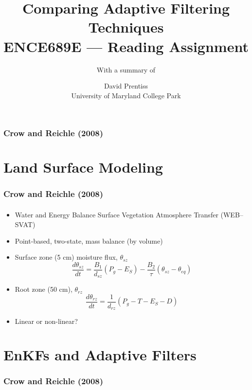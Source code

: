 \documentclass[mathserif]{beamer}
\begin{document}
\nobibliography*
\title{Comparing Adaptive Filtering Techniques \\ ENCE689E --- Reading Assignment}
\author{David Prentiss \\ University of Maryland College Park}
\subtitle{With a summary of \\ }

\frame{\titlepage}

\begin{frame}
  \frametitle{Crow and Reichle (2008)}
  \tableofcontents
\end{frame}

\section{Land Surface Modeling}

\begin{frame}
  \frametitle{Crow and Reichle (2008)}
  \tableofcontents[currentsection]
\end{frame}

\begin{frame}
  \frametitle{\insertsection}
  \begin{itemize}
    \item Water and Energy Balance Surface Vegetation Atmosphere Transfer (WEB--SVAT)
    \item Point-based, two-state, mass balance (by volume)
    \item Surface zone (5 cm) moisture flux, $\theta_{sz}$
      \begin{equation}
        \frac{d\theta_{sz}}{dt}=\frac{B_1}{d_{sz}}\left(P_g - E_S\right)-\frac{B_2}{\tau}\left(\theta_{sz}-\theta_{eq}\right)
      \end{equation}
    \item Root zone (50 cm), $\theta_{rz}$
      \begin{equation}
        \frac{d\theta_{rz}}{dt}=\frac{1}{d_{rz}}\left(P_g - T - E_S - D\right)
      \end{equation}
    \item Linear or non-linear?
  \end{itemize}
\end{frame}

\section{EnKFs and Adaptive Filters}

\begin{frame}
  \frametitle{Crow and Reichle (2008)}
  \tableofcontents[currentsection]
\end{frame}
\end{document}

